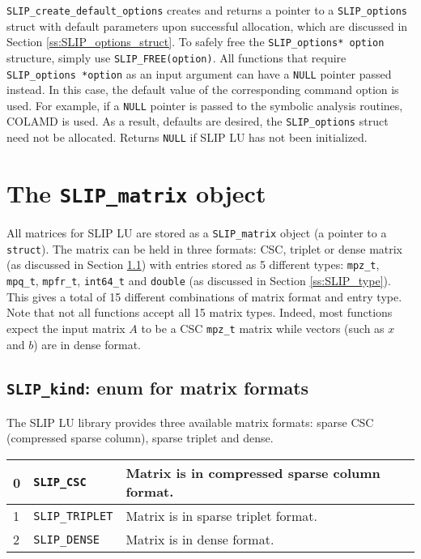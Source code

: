 \documentclass[12pt]{article}
\theoremstyle{definition}
\begin{document}
\verb|SLIP_create_default_options| creates and returns a pointer to a
\verb|SLIP_options| struct with default parameters upon successful allocation,
which are discussed in Section \ref{ss:SLIP_options_struct}.  To safely free
the \verb|SLIP_options* option| structure, simply use \verb|SLIP_FREE(option)|.
All functions that require \verb|SLIP_options *option| as an input argument can
have a \verb'NULL' pointer passed instead. In this case, the default value of
the corresponding command option is used. For example, if a \verb'NULL' pointer
is passed to the symbolic analysis routines, COLAMD is used. As a result,
defaults are desired, the \verb|SLIP_options| struct need not be allocated.
Returns \verb|NULL| if SLIP LU has not been initialized.

\cprotect\section{The \verb|SLIP_matrix| object} \label{ss:SLIP_matrix}

All matrices for SLIP LU are stored as a \verb|SLIP_matrix| object (a pointer
to a \verb'struct').  The matrix can be held in three formats: CSC, triplet or
dense matrix (as discussed in Section \ref{ss:SLIP_kind}) with entries stored
as 5 different types: \verb|mpz_t|, \verb|mpq_t|, \verb|mpfr_t|, \verb|int64_t|
and \verb|double| (as discussed in Section \ref{ss:SLIP_type}).  This gives a
total of 15 different combinations of matrix format and entry type. Note that
not all functions accept all 15 matrix types. Indeed, most functions expect the
input matrix $A$ to be a CSC \verb|mpz_t| matrix while vectors (such as $x$ and
$b$) are in dense format.

\cprotect\subsection{\verb|SLIP_kind|: enum for matrix formats}
\label{ss:SLIP_kind}

The SLIP LU library provides three available matrix formats: sparse CSC
(compressed sparse column), sparse triplet and dense.

{\small
\begin{center}
\begin{tabular}{llp{4in}}
\hline
0 & \verb|SLIP_CSC| & Matrix is in compressed sparse column format. \\
\hline
1 & \verb|SLIP_TRIPLET|      & Matrix is in sparse triplet format. \\
\hline
2 & \verb|SLIP_DENSE|        & Matrix is in dense format.\\
\hline
\end{tabular}
\label{tab:SLIP_kind}
\end{center}
}
\end{document}
